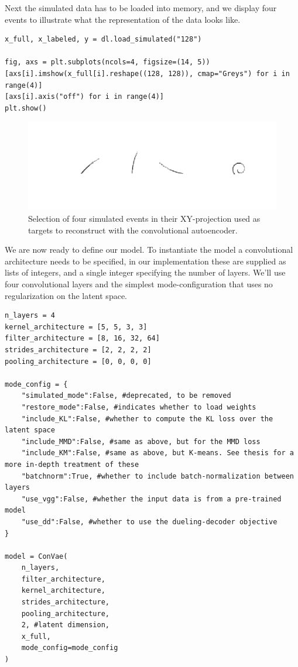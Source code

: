 \noindent Next the simulated data has to be loaded into memory, and we display four events to illustrate what the representation of the data  looks like.  

\begin{minipage}{\linewidth}
\begin{lstlisting}[language=iPython]
x_full, x_labeled, y = dl.load_simulated("128")

fig, axs = plt.subplots(ncols=4, figsize=(14, 5))
[axs[i].imshow(x_full[i].reshape((128, 128)), cmap="Greys") for i in range(4)]
[axs[i].axis("off") for i in range(4)]
plt.show()
\end{lstlisting}
\end{minipage}

\begin{figure}[H]
\centering
\includegraphics[width=\textwidth]{sim_events.pdf}
\caption[simulated events]{Selection of four simulated events in their XY-projection used as targets to reconstruct with the convolutional autoencoder.}\label{fig:sim_data}
\end{figure}

\noindent We are now ready to define our model. To instantiate the model a convolutional architecture needs to be specified, in our implementation these are supplied as lists of integers, and a single integer specifying the number of layers. We'll use four convolutional layers and the simplest mode-configuration that uses no regularization on the latent space.  

\begin{minipage}{\linewidth}
\begin{lstlisting}[language=iPython]
n_layers = 4
kernel_architecture = [5, 5, 3, 3]
filter_architecture = [8, 16, 32, 64]
strides_architecture = [2, 2, 2, 2]
pooling_architecture = [0, 0, 0, 0]

mode_config = {
    "simulated_mode":False, #deprecated, to be removed
    "restore_mode":False, #indicates whether to load weights 
    "include_KL":False, #whether to compute the KL loss over the latent space
    "include_MMD":False, #same as above, but for the MMD loss
    "include_KM":False, #same as above, but K-means. See thesis for a more in-depth treatment of these
    "batchnorm":True, #whether to include batch-normalization between layers
    "use_vgg":False, #whether the input data is from a pre-trained model 
    "use_dd":False, #whether to use the dueling-decoder objective 
}

model = ConVae(
    n_layers,
    filter_architecture,
    kernel_architecture,
    strides_architecture,
    pooling_architecture,
    2, #latent dimension,
    x_full,
    mode_config=mode_config
)
\end{lstlisting}
\end{minipage}


